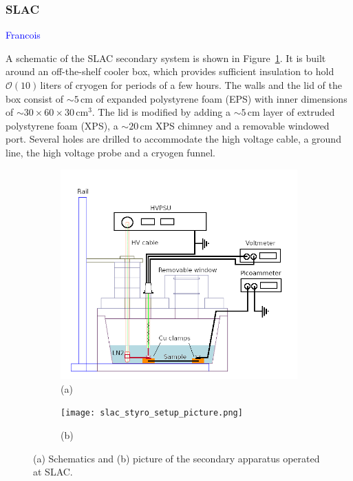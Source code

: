 \documentclass[a4paper,12pt]{article}
\begin{document}
\subsubsection{SLAC}
\label{sec:beerBox}
\textcolor{blue}{Francois}

A schematic of the SLAC secondary system is shown in Figure~\ref{fig:slac_styro_setup}. It is built around an off-the-shelf cooler box, which provides sufficient insulation to hold $\mathcal{O}(10)$\,liters of cryogen for periods of a few hours. The walls and the lid of the box consist of $\sim5$\,cm of expanded polystyrene foam (EPS) with inner dimensions of $\sim30\times60\times30$\,cm$^3$. The lid is modified by adding a $\sim5$\,cm layer of extruded polystyrene foam (XPS), a $\sim20$\,cm XPS chimney and a removable windowed port. Several holes are drilled to accommodate the high voltage cable, a ground line, the high voltage probe and a cryogen funnel.

\begin{figure}[htb]
\centering
\begin{subfigure}[c]{0.49\linewidth}
	\begin{center}
		\includegraphics[width=\linewidth]{slac_styro_setup.png}
		(a)
	\end{center}
\end{subfigure}
\begin{subfigure}[c]{0.49\linewidth}
	\begin{center}
		\vspace*{1em}
		
		\texttt{[image: slac\_styro\_setup\_picture.png]}
		\vspace*{0.5em}
		
		(b)
	\end{center}
\end{subfigure}
\caption{(a) Schematics and (b) picture of the secondary apparatus operated at SLAC.}
\label{fig:slac_styro_setup}
\end{figure}
\end{document}
